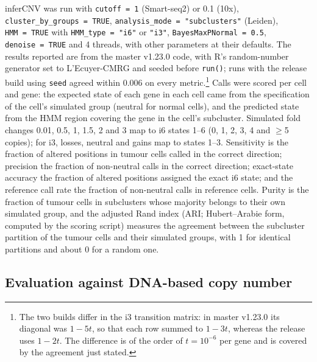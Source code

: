inferCNV was run with \texttt{cutoff\ =\ 1} (Smart-seq2) or 0.1 (10x), \texttt{cluster\_by\_groups\ =\ TRUE}, \texttt{analysis\_mode\ =\ "subclusters"} (Leiden), \texttt{HMM\ =\ TRUE} with \texttt{HMM\_type\ =\ "i6"} or \texttt{"i3"}, \texttt{BayesMaxPNormal\ =\ 0.5}, \texttt{denoise\ =\ TRUE} and 4 threads, with other parameters at their defaults. The results reported are from the master v1.23.0 code, with R's random-number generator set to L'Ecuyer-CMRG and seeded before \texttt{run()}; runs with the release build using \texttt{seed} agreed within 0.006 on every metric.\footnote{The two builds differ in the i3 transition matrix: in master v1.23.0 its diagonal was $1-5t$, so that each row summed to $1-3t$, whereas the release uses $1-2t$. The difference is of the order of $t = 10^{-6}$ per gene and is covered by the agreement just stated.} Calls were scored per cell and gene: the expected state of each gene in each cell came from the specification of the cell's simulated group (neutral for normal cells), and the predicted state from the HMM region covering the gene in the cell's subcluster. Simulated fold changes 0.01, 0.5, 1, 1.5, 2 and 3 map to i6 states 1--6 (0, 1, 2, 3, 4 and $\geq$5 copies); for i3, losses, neutral and gains map to states 1--3. Sensitivity is the fraction of altered positions in tumour cells called in the correct direction; precision the fraction of non-neutral calls in the correct direction; exact-state accuracy the fraction of altered positions assigned the exact i6 state; and the reference call rate the fraction of non-neutral calls in reference cells. Purity is the fraction of tumour cells in subclusters whose majority belongs to their own simulated group, and the adjusted Rand index (ARI; Hubert--Arabie form, computed by the scoring script) measures the agreement between the subcluster partition of the tumour cells and their simulated groups, with 1 for identical partitions and about 0 for a random one.

\subsection{Evaluation against DNA-based copy number}

